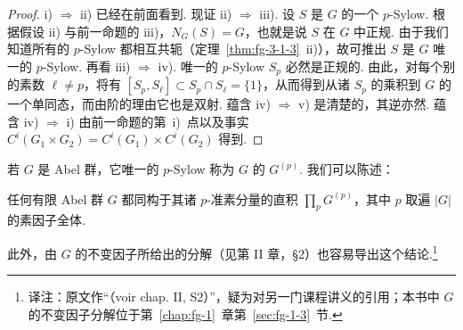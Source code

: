 \begin{proof}
i) $\Rightarrow$ ii) 已经在前面看到. 现证 ii) $\Rightarrow$ iii). 设 $S$ 是 $G$ 的一个 $p$-Sylow. 根据假设 ii) 与前一命题的 iii)，$N_G(S)=G$，也就是说 $S$ 在 $G$ 中正规. 由于我们知道所有的 $p$-Sylow 都相互共轭（定理~\ref{thm:fg-3-1-3}~ii)），故可推出 $S$ 是 $G$ 唯一的 $p$-Sylow. 再看 iii) $\Rightarrow$ iv). 唯一的 $p$-Sylow $S_p$ 必然是正规的. 由此，对每个别的素数 $\ell\neq p$，将有 $[S_p,S_\ell]\subset S_p\cap S_\ell=\{1\}$，从而得到从诸 $S_p$ 的乘积到 $G$ 的一个单同态，而由阶的理由它也是双射. 蕴含 iv) $\Rightarrow$ v) 是清楚的，其逆亦然. 蕴含 iv) $\Rightarrow$ i) 由前一命题的第~i)~点以及事实 $C^i(G_1\times G_2)=C^i(G_1)\times C^i(G_2)$ 得到.
\end{proof}

若 $G$ 是 Abel 群，它唯一的 $p$-Sylow 称为 $G$ 的 $G^{(p)}$. 我们可以陈述：

\begin{corollary}\label{cor:fg-3-2-12}
任何有限 Abel 群 $G$ 都同构于其诸 $p$-准素分量的直积 $\prod_p G^{(p)}$，其中 $p$ 取遍 $|G|$ 的素因子全体.
\end{corollary}

此外，由 $G$ 的不变因子所给出的分解（见第 II 章，\S2）也容易导出这个结论.\footnote{译注：原文作``（voir chap. II, S2）''，疑为对另一门课程讲义的引用；本书中 $G$ 的不变因子分解位于第~\ref{chap:fg-1}~章第~\ref{sec:fg-1-3}~节.}
